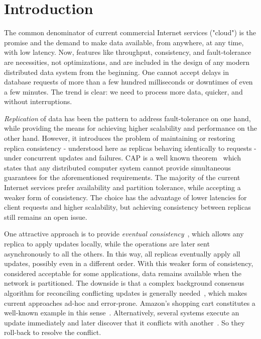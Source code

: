 \section{Introduction}
\label{sec:introduction}

The common denominator of current commercial Internet services ("cloud") is the
promise and the demand to make data available, from anywhere, at any time, with
low latency. Now, features like throughput, consistency, and fault-tolerance are
necessities, not optimizations, and are included in the design of any modern
distributed data system from the beginning. One cannot accept delays in database
requests of more than a few hundred milliseconds or downtimes of even a few
minutes. The trend is clear: we need to process more data, quicker, and without
interruptions.

\textit{Replication} of data has been the pattern to address fault-tolerance on
one hand, while providing the means for achieving higher scalability and
performance on the other hand. However, it introduces the problem of maintaining
or restoring replica consistency - understood here as replicas behaving
identically to requests - under concurrent updates and failures. CAP is a well
known theorem~\cite{Gilbert:2002:BCF:564585.564601} which states that any
distributed computer system cannot provide simultaneous guarantees for the
aforementioned requirements. The majority of the current Internet services
prefer availability and partition tolerance, while accepting a weaker form of
consistency. The choice has the advantage of lower latencies for client requests
and higher scalability, but achieving consistency between replicas still remains
an open issue.

One attractive approach is to provide \textit{eventual
consistency}~\cite{DBLP:journals/queue/Vogels08a,Saito:2005:OR:1057977.1057980},
which allows any replica to apply updates locally, while the operations are
later sent asynchronously to all the others. In this way, all replicas
eventually apply all updates, possibly even in a different order. With this
weaker form of consistency, considered acceptable for some applications, data
remains available when the network is partitioned. The downside is that a
complex background consensus algorithm for reconciling conflicting updates is
generally needed~\cite{Terry:1995:MUC:224056.224070}, which makes current
approaches ad-hoc and error-prone. Amazon's shopping cart constitutes a
well-known example in this sense~\cite{DeCandia:2007:DAH:1294261.1294281}.
Alternatively, several systems execute an update immediately and later discover
that it conflicts with another~\cite{Terry:1995:MUC:224056.224070}. So they
roll-back to resolve the conflict.

